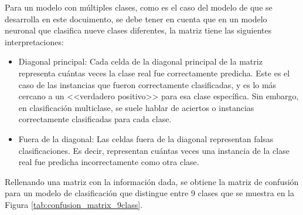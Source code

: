 Para un modelo con múltiples clases, como es el caso del modelo de que se desarrolla en este docuimento, se debe tener en cuenta que en un modelo neuronal que clasifica nueve clases diferentes, la matriz tiene las siguientes interpretaciones:
\begin{itemize}
	\item Diagonal principal: Cada celda de la diagonal principal de la matriz representa cuántas veces la clase real fue correctamente predicha. Este es el caso de las instancias que fueron correctamente clasificadas, y es lo más cercano a un <<verdadero positivo>> para esa clase específica. Sin embargo, en clasificación multiclase, se suele hablar de aciertos o instancias correctamente clasificadas para cada clase.
	\item Fuera de la diagonal: Las celdas fuera de la diagonal representan falsas clasificaciones. Es decir, representan cuántas veces una instancia de la clase real fue predicha incorrectamente como otra clase.

\end{itemize}
Rellenando una matriz con la información dada, se obtiene la matriz de confusión para un modelo de clasificación que distingue entre 9 clases que se muestra en la Figura \ref{tab:confusion_matrix_9class}.


